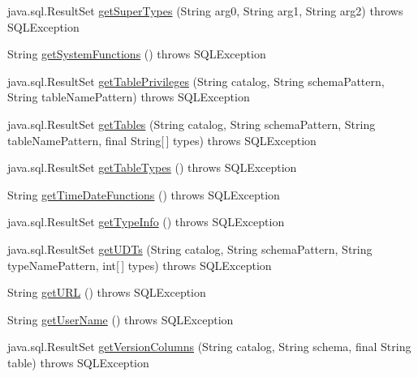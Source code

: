 \begin{DoxyCompactItemize}
\item 
java.\+sql.\+Result\+Set \mbox{\hyperlink{classcom_1_1mysql_1_1cj_1_1jdbc_1_1_database_meta_data_a2eec314ca7b01a8252333995f2df109d}{get\+Super\+Types}} (String arg0, String arg1, String arg2)  throws S\+Q\+L\+Exception 
\item 
String \mbox{\hyperlink{classcom_1_1mysql_1_1cj_1_1jdbc_1_1_database_meta_data_a3227b7f48ec0b980f1a749c4f9544c69}{get\+System\+Functions}} ()  throws S\+Q\+L\+Exception 
\item 
java.\+sql.\+Result\+Set \mbox{\hyperlink{classcom_1_1mysql_1_1cj_1_1jdbc_1_1_database_meta_data_adf4cdd4f2a6189234a11e9a7c27be8b1}{get\+Table\+Privileges}} (String catalog, String schema\+Pattern, String table\+Name\+Pattern)  throws S\+Q\+L\+Exception 
\item 
java.\+sql.\+Result\+Set \mbox{\hyperlink{classcom_1_1mysql_1_1cj_1_1jdbc_1_1_database_meta_data_ab5f3f694cbfe95c1f5b7f0afd6ff79d4}{get\+Tables}} (String catalog, String schema\+Pattern, String table\+Name\+Pattern, final String\mbox{[}$\,$\mbox{]} types)  throws S\+Q\+L\+Exception 
\item 
java.\+sql.\+Result\+Set \mbox{\hyperlink{classcom_1_1mysql_1_1cj_1_1jdbc_1_1_database_meta_data_a058dac71420e98cff87127834f9c3c75}{get\+Table\+Types}} ()  throws S\+Q\+L\+Exception 
\item 
String \mbox{\hyperlink{classcom_1_1mysql_1_1cj_1_1jdbc_1_1_database_meta_data_a8237f7df21503f6c3eeda4a98997aad3}{get\+Time\+Date\+Functions}} ()  throws S\+Q\+L\+Exception 
\item 
java.\+sql.\+Result\+Set \mbox{\hyperlink{classcom_1_1mysql_1_1cj_1_1jdbc_1_1_database_meta_data_a052c5701308c5ade28258a7416ffa40f}{get\+Type\+Info}} ()  throws S\+Q\+L\+Exception 
\item 
java.\+sql.\+Result\+Set \mbox{\hyperlink{classcom_1_1mysql_1_1cj_1_1jdbc_1_1_database_meta_data_a04aae07068fdf0bd4783c6f12c551dde}{get\+U\+D\+Ts}} (String catalog, String schema\+Pattern, String type\+Name\+Pattern, int\mbox{[}$\,$\mbox{]} types)  throws S\+Q\+L\+Exception 
\item 
String \mbox{\hyperlink{classcom_1_1mysql_1_1cj_1_1jdbc_1_1_database_meta_data_a2a8e539e06d048726861836dd282cd27}{get\+U\+RL}} ()  throws S\+Q\+L\+Exception 
\item 
String \mbox{\hyperlink{classcom_1_1mysql_1_1cj_1_1jdbc_1_1_database_meta_data_a9fe2eb13aa496f7a607a6c88d9f9fc8d}{get\+User\+Name}} ()  throws S\+Q\+L\+Exception 
\item 
java.\+sql.\+Result\+Set \mbox{\hyperlink{classcom_1_1mysql_1_1cj_1_1jdbc_1_1_database_meta_data_acf5d600c5e4bd59cb60e90d355d439c4}{get\+Version\+Columns}} (String catalog, String schema, final String table)  throws S\+Q\+L\+Exception 

\end{DoxyCompactItemize}
